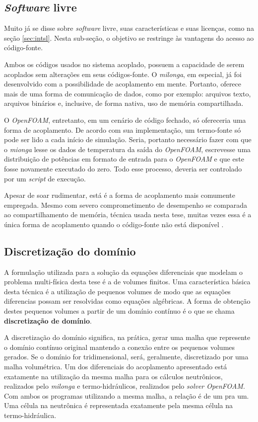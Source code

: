 \subsection{\textit{Software} livre}
\label{subsec:sl}

Muito já se disse sobre \textit{software} livre, suas características e suas licenças, como na
seção \ref{sec:intsl}. Nesta sub-seção, o objetivo se restringe às vantagens do acesso ao
código-fonte.

Ambos os códigos usados no sistema acoplado, possuem a capacidade de serem acoplados sem alterações
em seus códigos-fonte. O \textit{milonga}, em especial, já foi desenvolvido com a possibilidade
de acoplamento em mente. Portanto, oferece mais de uma forma de comunicação de dados, como por exemplo:
arquivos texto, arquivos binários e, inclusive, de forma nativa, uso de memória compartilhada.

O \textit{OpenFOAM}, entretanto, em um cenário de código fechado, só ofereceria uma forma de
acoplamento. De acordo com sua implementação, um termo-fonte só pode ser lido a cada início de
simulação. Seria, portanto necessário fazer com que o \textit{mionga} lesse os dados de temperatura
da saída do \textit{OpenFOAM}, escrevesse uma distribuição de potências em formato de entrada
para o \textit{OpenFOAM} e que este fosse novamente executado do zero. Todo esse processo, deveria
ser controlado por um \textit{script} de execução.

Apesar de soar rudimentar, está é a forma de acoplamento mais comumente empregada.
Mesmo com severo comprometimento de desempenho se comparada ao compartilhamento de
memória, técnica usada nesta tese, muitas vezes essa é a única forma de acoplamento
quando o código-fonte não está disponível \cite{Ivanov2007}.

\subsection{Discretização do domínio}
\label{subsec:dd}

A formulação utilizada para a solução da equações diferenciais que modelam o problema multi-física desta
tese é a de volumes finitos. Uma característica básica desta técnica é a utilização de pequenos volumes
de modo que as equações diferencias possam ser resolvidas como equações algébricas. A forma de obtenção
destes pequenos volumes a partir de um domínio contínuo é o que se chama \textbf{discretização de domínio}. 

A discretização do domínio significa, na prática, gerar uma malha que represente o domínio contínuo original
mantendo a conexão entre os pequenos volumes gerados. Se o domínio for tridimensional, será, geralmente,
discretizado por uma malha volumétrica. Um dos diferenciais do acoplamento apresentado está exatamente na
utilização da mesma malha para os cálculos neutrônicos, realizados pelo \textit{milonga} e termo-hidráulicos,
realizados pelo \textit{solver OpenFOAM}. Com ambos os programas utilizando a mesma malha, a relação é de um
pra um. Uma célula na neutrônica é representada exatamente pela mesma célula na termo-hidráulica.

